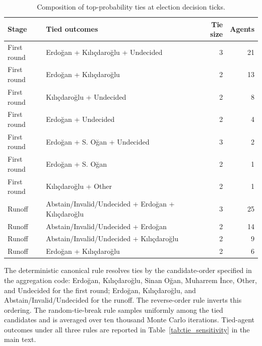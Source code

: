 \documentclass[12pt,a4paper]{report}
\begin{document}
\begin{table}[!ht]
\caption{Composition of top-probability ties at election decision ticks.}
\label{tab:tie_composition}
\centering
\footnotesize
\begin{tabular}{@{}llrr@{}}
\toprule
Stage & Tied outcomes & Tie size & Agents \\
\midrule
First round & Erdoğan + Kılıçdaroğlu + Undecided                                  & 3 & 21 \\
First round & Erdoğan + Kılıçdaroğlu                                              & 2 & 13 \\
First round & Kılıçdaroğlu + Undecided                                            & 2 &  8 \\
First round & Erdoğan + Undecided                                                 & 2 &  4 \\
First round & Erdoğan + S. Oğan + Undecided                                       & 3 &  2 \\
First round & Erdoğan + S. Oğan                                                   & 2 &  1 \\
First round & Kılıçdaroğlu + Other                                                & 2 &  1 \\
\midrule
Runoff      & Abstain/Invalid/Undecided + Erdoğan + Kılıçdaroğlu                  & 3 & 25 \\
Runoff      & Abstain/Invalid/Undecided + Erdoğan                                 & 2 & 14 \\
Runoff      & Abstain/Invalid/Undecided + Kılıçdaroğlu                            & 2 &  9 \\
Runoff      & Erdoğan + Kılıçdaroğlu                                              & 2 &  6 \\
\bottomrule
\end{tabular}
\end{table}

The deterministic canonical rule resolves ties by the candidate-order specified in the aggregation code: Erdoğan, Kılıçdaroğlu, Sinan Oğan, Muharrem İnce, Other, and Undecided for the first round; Erdoğan, Kılıçdaroğlu, and Abstain/Invalid/Undecided for the runoff. The reverse-order rule inverts this ordering. The random-tie-break rule samples uniformly among the tied candidates and is averaged over ten thousand Monte Carlo iterations. Tied-agent outcomes under all three rules are reported in Table~\ref{tab:tie_sensitivity} in the main text.
\end{document}
